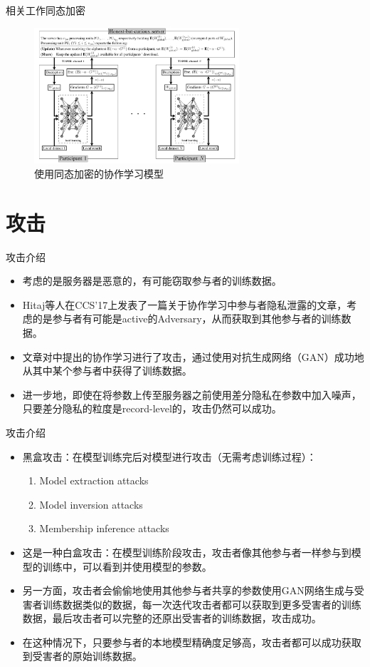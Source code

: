 \documentclass[aspectratio=169]{beamer}
\begin{document}
\begin{frame}{相关工作}{同态加密}
\begin{figure}[!ht]
\includegraphics[width = 3in]{fig/TIFS17.png}
\caption{使用同态加密的协作学习模型}
\label{fig:TIFS17}
\end{figure}
\end{frame}

\section{攻击}
\begin{frame}{攻击}{介绍}
\begin{itemize}
\item \cite{Phong2017PrivacyPreservingDL}考虑的是服务器是恶意的，有可能窃取参与者的训练数据。
\item Hitaj等人在CCS'17上发表了一篇关于协作学习中参与者隐私泄露的文章\cite{hitaj2017deep}，考虑的是参与者有可能是active的Adversary，从而获取到其他参与者的训练数据。
\item 文章\cite{hitaj2017deep}对\cite{shokri2015privacy}中提出的协作学习进行了攻击，通过使用对抗生成网络（GAN）成功地从其中某个参与者中获得了训练数据。
\item 进一步地，即使在将参数上传至服务器之前使用差分隐私在参数中加入噪声，只要差分隐私的粒度是record-level的，攻击仍然可以成功。
\end{itemize}
\end{frame}

\begin{frame}{攻击}{介绍}
\begin{itemize}
\item 黑盒攻击：在模型训练完后对模型进行攻击（无需考虑训练过程）：
	\begin{enumerate}
 	\item Model extraction attacks
 	\item Model inversion attacks
 	\item Membership inference attacks
 	\end{enumerate}
\item 这是一种白盒攻击：在模型训练阶段攻击，攻击者像其他参与者一样参与到模型的训练中，可以看到并使用模型的参数。
\item 另一方面，攻击者会偷偷地使用其他参与者共享的参数使用GAN网络生成与受害者训练数据类似的数据，每一次迭代攻击者都可以获取到更多受害者的训练数据，最后攻击者可以完整的还原出受害者的训练数据，攻击成功。
\item 在这种情况下，只要参与者的本地模型精确度足够高，攻击者都可以成功获取到受害者的原始训练数据。
\end{itemize}
\end{frame}
\end{document}
